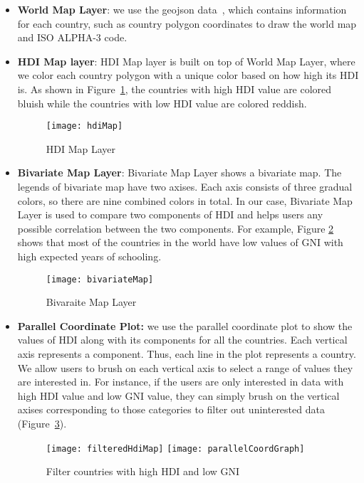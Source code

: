 \begin{itemize}
	\item \textbf{World Map Layer}: we use the geojson data~\cite{geocountries}, which contains information for each country, such as country polygon coordinates to draw the world map and ISO ALPHA-3 code.
	\item \textbf{HDI Map layer}: HDI Map layer is built on top of World Map Layer, where we color each country polygon with a unique color based on how high its HDI is. As shown in Figure~\ref{fig:hdi}, the countries with high HDI value are colored bluish while the countries with low HDI value are colored reddish.
	\begin{figure}[t]
        \centering
		\texttt{[image: hdiMap]}
		\caption{HDI Map Layer}
		\label{fig:hdi}
	\end{figure}
	\item \textbf{Bivariate Map Layer}: Bivariate Map Layer shows a bivariate map. The legends of bivariate map have two axises. Each axis consists of three gradual colors, so there are nine combined colors in total. In our case, Bivariate Map Layer is used to compare two components of HDI and helps users any possible correlation between the two components. For example, Figure \ref{fig:bivariate} shows that most of the countries in the world have low values of GNI with high expected years of schooling.
	\begin{figure}[t]
        \centering
		\texttt{[image: bivariateMap]}
		\caption{Bivaraite Map Layer}
		\label{fig:bivariate}
	\end{figure}
	\item \textbf{Parallel Coordinate Plot:} we use the parallel coordinate plot to show the values of HDI along with its components for all the countries. Each vertical axis represents a component. Thus, each line in the plot represents a country. We allow users to brush on each vertical axis to select a range of values they are interested in. For instance, if the users are only interested in data with high HDI value and low GNI value, they can simply brush on the vertical axises corresponding to those categories to filter out uninterested data (Figure~\ref{fig:parallel}).
	\begin{figure}[t]
        \centering
		\texttt{[image: filteredHdiMap]}
		\texttt{[image: parallelCoordGraph]}
		\caption{Filter countries with high HDI and low GNI}
		\label{fig:parallel}
	\end{figure}

\end{itemize}
